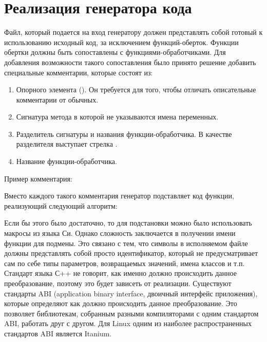 \section{Реализация генератора кода}

Файл, который подается на вход генератору должен представлять собой готовый к
использованию исходный код, за исключением функций-оберток. Функции обертки
должны быть сопоставлены с функциями-обработчиками. Для добавления возможности
такого сопоставления было принято решение добавить специальные комментарии,
которые состоят из:

\begin{enumerate}
	\item Опорного элемента (). Он требуется для того, чтобы
		отличать описательные комментарии от обычных.
	\item Сигнатура метода в которой не указываются имена переменных.
	\item Разделитель сигнатуры и названия функции-обработчика. В качестве
		разделителя выступает стрелка \code{->}.
	\item Название функции-обработчика.
\end{enumerate}

Пример комментария: 

Вместо каждого такого комментария генератор подставляет код функции, реализующий
следующий алгоритм:

\begin{algorithm}[H]
\end{algorithm}

Если бы этого было достаточно, то для подстановки можно было использовать
макросы из языка Си. Однако сложность заключается в получении имени функции для
подмены. Это связано с тем, что символы в исполняемом файле должны представлять
собой просто идентификатор, который не предусматривает сам по себе типы
параметров, возвращаемых значений, имена классов и т.п.
Стандарт языка С++ не говорит, как именно должно происходить данное
преобразование, поэтому это будет зависеть от реализации. Существуют стандарты
ABI (application binary interface, двоичный интерфейс приложения), которые
определяют как должно происходить данное преобразование. Это позволяет
библиотекам, собранным разными компиляторами с одним стандартом ABI, работать
друг с другом. Для Linux одним из наиболее распространенных стандартов ABI
является Itanium\cite{itaniumabi}.


